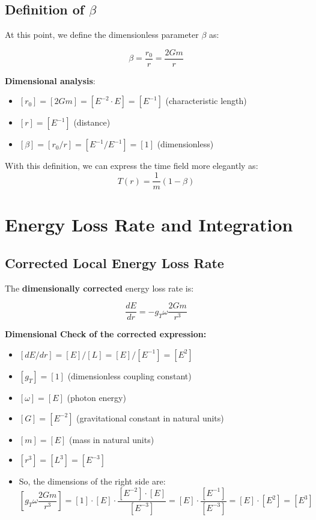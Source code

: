 \documentclass[12pt,a4paper]{article}
\begin{document}
	\subsection{Definition of $\beta$}
	
	At this point, we define the dimensionless parameter $\beta$ as:
	
	\begin{equation}
		\label{eq:beta_definition}
		\beta = \frac{r_0}{r} = \frac{2Gm}{r}
	\end{equation}
	
	\textbf{Dimensional analysis}:
	\begin{itemize}
		\item $[r_0] = [2Gm] = [E^{-2} \cdot E] = [E^{-1}]$ (characteristic length)
		\item $[r] = [E^{-1}]$ (distance)
		\item $[\beta] = [r_0/r] = [E^{-1}/E^{-1}] = [1]$ (dimensionless) \checkmark
	\end{itemize}
	
	With this definition, we can express the time field more elegantly as:
	\begin{equation}
		\label{eq:time_field_with_beta}
		T(r) = \frac{1}{m}(1 - \beta)
	\end{equation}
	
	\section{Energy Loss Rate and Integration}
	\label{sec:loss_rate}
	
	\subsection{Corrected Local Energy Loss Rate}
	\label{subsec:local_rate}
	
	The \textbf{dimensionally corrected} energy loss rate is:
	
	\begin{equation}
		\label{eq:loss_rate_corrected}
		\frac{dE}{dr} = -g_T \omega \frac{2Gm}{r^3}
	\end{equation}
	
	\textbf{Dimensional Check of the corrected expression:}
	\begin{itemize}
		\item $[dE/dr] = [E]/[L] = [E]/[E^{-1}] = [E^2]$
		\item $[g_T] = [1]$ (dimensionless coupling constant)
		\item $[\omega] = [E]$ (photon energy)
		\item $[G] = [E^{-2}]$ (gravitational constant in natural units)
		\item $[m] = [E]$ (mass in natural units)
		\item $[r^3] = [L^3] = [E^{-3}]$
		\item So, the dimensions of the right side are:
		$$[g_T \omega \frac{2Gm}{r^3}] = [1] \cdot [E] \cdot \frac{[E^{-2}] \cdot [E]}{[E^{-3}]} = [E] \cdot \frac{[E^{-1}]}{[E^{-3}]} = [E] \cdot [E^2] = [E^3]$$
	\end{itemize}
	
\end{document}
